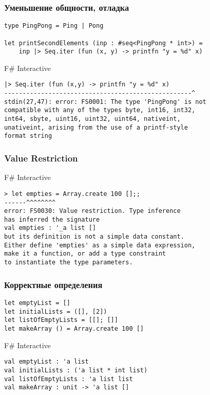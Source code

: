 \documentclass{../../slides-style}
\begin{document}
    \begin{frame}[fragile]
        \frametitle{Уменьшение общности, отладка}
        \begin{verbatim}
type PingPong = Ping | Pong

let printSecondElements (inp : #seq<PingPong * int>) =
    inp |> Seq.iter (fun (x, y) -> printfn "y = %d" x)
        \end{verbatim}

        \begin{alertblock}{F\# Interactive}
            \begin{verbatim}
|> Seq.iter (fun (x,y) -> printfn "y = %d" x)
---------------------------------------------------^
stdin(27,47): error: FS0001: The type 'PingPong' is not 
compatible with any of the types byte, int16, int32, 
int64, sbyte, uint16, uint32, uint64, nativeint, 
unativeint, arising from the use of a printf-style 
format string
            \end{verbatim}
        \end{alertblock}
    \end{frame}

    \begin{frame}[fragile]
        \frametitle{Value Restriction}
        \begin{alertblock}{F\# Interactive}
            \begin{verbatim}
> let empties = Array.create 100 [];;
------^^^^^^^^
error: FS0030: Value restriction. Type inference 
has inferred the signature 
val empties : '_a list []
but its definition is not a simple data constant. 
Either define 'empties' as a simple data expression, 
make it a function, or add a type constraint 
to instantiate the type parameters.
            \end{verbatim}
        \end{alertblock}
    \end{frame}

    \begin{frame}[fragile]
        \frametitle{Корректные определения}
        \begin{verbatim}
let emptyList = []
let initialLists = ([], [2])
let listOfEmptyLists = [[]; []]
let makeArray () = Array.create 100 []
        \end{verbatim}
        
        \begin{alertblock}{F\# Interactive}
            \begin{verbatim}
val emptyList : 'a list
val initialLists : ('a list * int list)
val listOfEmptyLists : 'a list list
val makeArray : unit -> 'a list []
            \end{verbatim}
        \end{alertblock}
    \end{frame}
\end{document}
